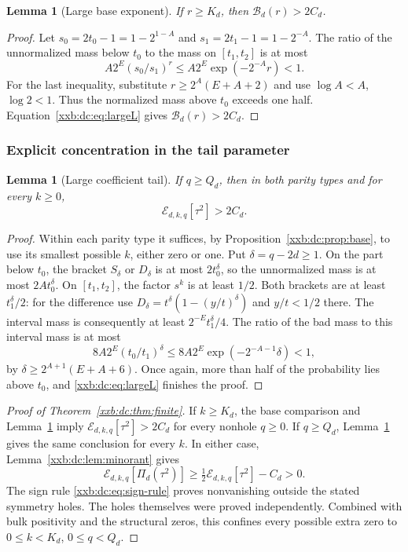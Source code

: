 \documentclass[11pt,a4paper]{article}
\numberwithin{equation}{section}
\newtheorem{lemma}[theorem]{Lemma}
\theoremstyle{definition}
\theoremstyle{remark}
\theoremstyle{plain}
\begin{document}
\begin{lemma}[Large base exponent]\label{xxb:dc:lem:largek}
If $r\ge K_d$, then $\mathcal B_d(r)>2C_d$.
\end{lemma}
\begin{proof}
Let $s_0=2t_0-1=1-2^{1-A}$ and
$s_1=2t_1-1=1-2^{-A}$.  The ratio of the unnormalized mass below $t_0$ to
the mass on $[t_1,t_2]$ is at most
\[
 A2^E(s_0/s_1)^r\le A2^E\exp(-2^{-A}r)<1.
\]
For the last inequality, substitute $r\ge2^A(E+A+2)$ and use
$\log A<A$, $\log2<1$.  Thus the normalized mass above $t_0$ exceeds
one half.  Equation~\eqref{xxb:dc:eq:largeL} gives $\mathcal B_d(r)>2C_d$.
\end{proof}

\subsubsection{Explicit concentration in the tail parameter}
\begin{lemma}[Large coefficient tail]\label{xxb:dc:lem:largeq}
If $q\ge Q_d$, then in both parity types and for every $k\ge0$,
\[
 \mathcal E_{d,k,q}[\tau^2]>2C_d.
\]
\end{lemma}
\begin{proof}
Within each parity type it suffices, by
Proposition~\ref{xxb:dc:prop:base}, to use its smallest possible $k$, either
zero or one.  Put $\delta=q-2d\ge1$.  On the part below $t_0$, the bracket
$S_\delta$ or $D_\delta$ is at most $2t_0^\delta$, so the unnormalized
mass is at most $2At_0^\delta$.
On $[t_1,t_2]$, the factor $s^k$ is at least $1/2$.  Both brackets are at
least $t_1^\delta/2$: for the difference use
$D_\delta=t^\delta(1-(y/t)^\delta)$ and $y/t<1/2$ there.
The interval mass is consequently at least $2^{-E}t_1^\delta/4$.
The ratio of the bad mass to this interval mass is at most
\[
 8A2^E(t_0/t_1)^\delta
 \le8A2^E\exp(-2^{-A-1}\delta)<1,
\]
by $\delta\ge2^{A+1}(E+A+6)$.  Once again, more than half of the
probability lies above $t_0$, and \eqref{xxb:dc:eq:largeL} finishes the proof.
\end{proof}

\begin{proof}[Proof of Theorem~\ref{xxb:dc:thm:finite}]
If $k\ge K_d$, the base comparison and Lemma~\ref{xxb:dc:lem:largek} imply
$\mathcal E_{d,k,q}[\tau^2]>2C_d$ for every nonhole $q\ge0$.  If $q\ge Q_d$,
Lemma~\ref{xxb:dc:lem:largeq} gives the same conclusion for every $k$.
In either case, Lemma~\ref{xxb:dc:lem:minorant} gives
\[
 \mathcal E_{d,k,q}[\Pi_d(\tau^2)]
 \ge\tfrac12\mathcal E_{d,k,q}[\tau^2]-C_d>0.
\]
The sign rule \eqref{xxb:dc:eq:sign-rule} proves nonvanishing outside the
stated symmetry holes.  The holes themselves were proved independently.
Combined with bulk positivity and the structural zeros, this confines every
possible extra zero to $0\le k<K_d$, $0\le q<Q_d$.
\end{proof}
\end{document}
